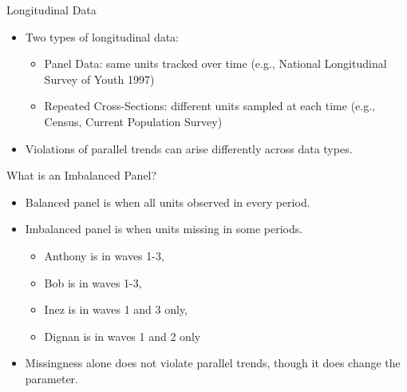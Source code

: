 \documentclass{beamer}
\begin{document}
\begin{frame}{Longitudinal Data}

\begin{itemize}

\item Two types of longitudinal data:
    \begin{itemize}
      \item Panel Data: same units tracked over time (e.g., National Longitudinal Survey of Youth 1997)
      \item Repeated Cross-Sections: different units sampled at each time (e.g., Census, Current Population Survey)
    \end{itemize}
    \item Violations of parallel trends can arise differently across data types.
\end{itemize}

\end{frame}


\begin{frame}{What is an Imbalanced Panel?}
  \begin{itemize}
    \item Balanced panel is when all units observed in every period.
    \item Imbalanced panel is when units missing in some periods.
		\begin{itemize}
		\item Anthony is in waves 1-3, 
		\item Bob is in waves 1-3, 
		\item Inez is in waves 1 and 3 only, 
		\item Dignan is in waves 1 and 2 only
		\end{itemize}
    \item Missingness alone does not violate parallel trends, though it does change the parameter.
  \end{itemize}
\end{frame}
\end{document}
